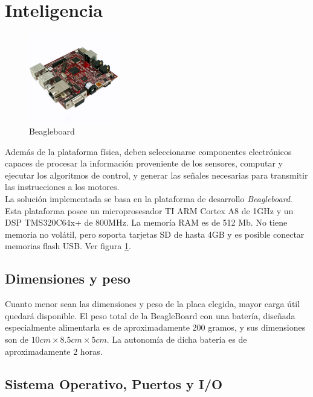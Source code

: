 \documentclass[main]{subfiles}
\begin{document}
\section{Inteligencia}
\begin{figure}
\vspace{-30pt}
	\centering
	\includegraphics[width=0.35\textwidth]{./pics_eleccion_hardware/beagle.pdf}
\vspace{-30pt}
	\caption{Beagleboard}
	\label{fig:beagleboard}
\end{figure}


Adem\'as de la plataforma f\'isica, deben seleccionarse componentes electr\'onicos capaces de procesar la informaci\'on proveniente de los sensores, computar y ejecutar los algoritmos de control, y generar las se\~nales necesarias para transmitir las instrucciones a los motores.\\

La soluci\'on implementada se basa en la plataforma de desarrollo \emph{Beagleboard}. Esta plataforma posee un microprosesador TI ARM Cortex A8 de 1GHz y un DSP TMS320C64x+ de 800MHz. La memor\'ia RAM es de 512 Mb. No tiene memoria no vol\'atil, pero soporta tarjetas SD de hasta 4GB y es posible conectar memorias flash USB. Ver figura \ref{fig:beagleboard}.

\subsection*{Dimensiones y peso}

Cuanto menor sean las dimensiones y peso de la placa elegida, mayor carga \'util quedar\'a disponible. El peso total de la BeagleBoard con una bater\'ia, diseñada especialmente alimentarla es de aproximadamente 200 gramos, y sus dimensiones son de $10cm\times8.5cm\times5cm$. La autonom\'ia de dicha bater\'ia es de aproximadamente 2 horas.

\subsection*{Sistema Operativo, Puertos y I/O}
\end{document}
